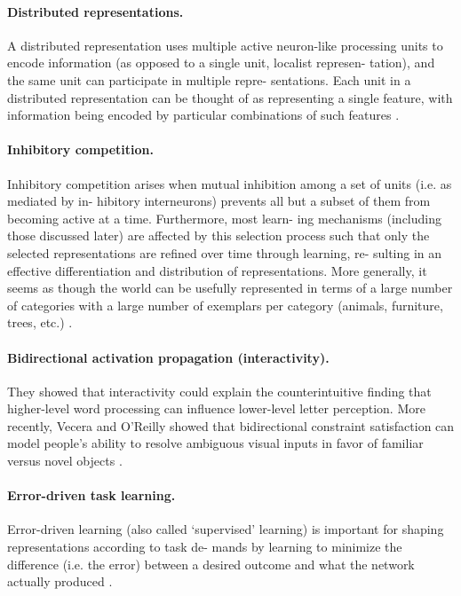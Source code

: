 \paragraph{Distributed representations.} A distributed representation
uses multiple active neuron-like processing units to encode
information (as opposed to a single unit, localist represen-
tation), and the same unit can participate in multiple repre-
sentations. Each unit in a distributed representation can be
thought of as representing a single feature, with information
being encoded by particular combinations of such features \citet{hinton1988learning}.

\paragraph{Inhibitory competition.} Inhibitory competition arises when mutual
inhibition among a set of units (i.e. as mediated by in-
hibitory interneurons) prevents all but a subset of them
from becoming active at a time.  Furthermore, most learn-
ing mechanisms (including those discussed later) are
affected by this selection process such that only the selected
representations are refined over time through learning, re-
sulting in an effective differentiation and distribution of
representations. More generally, it seems as though the world can be usefully
represented in terms of a large number of categories with a
large number of exemplars per category (animals, furniture,
trees, etc.) \citet{hinton1988learning}. 

\paragraph{Bidirectional activation propagation (interactivity).} They showed that
interactivity could explain the counterintuitive finding that
higher-level word processing can influence lower-level letter
perception. More recently, Vecera and O’Reilly showed
that bidirectional constraint satisfaction can model people’s
ability to resolve ambiguous visual inputs in favor of familiar
versus novel objects \citet{hinton1988learning}. 

\paragraph{Error-driven task learning.} Error-driven learning (also called ‘supervised’ learning) is
important for shaping representations according to task de-
mands by learning to minimize the difference (i.e. the error)
between a desired outcome and what the network actually
produced \citet{hinton1988learning}. 

